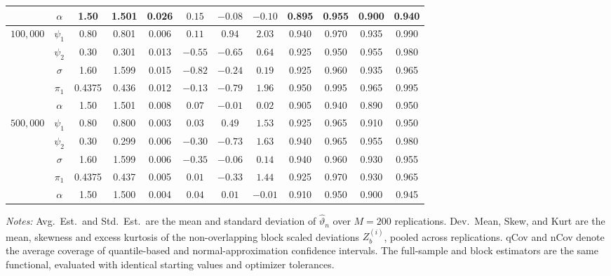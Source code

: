 \begin{table}[!h]
{\begin{tabular}{lccccccccccc}
& $\alpha$ & 1.50 & 1.501 & 0.026 & $0.15$ & $-0.08$ & $-0.10$ & 0.895 & 0.955 & 0.900 & 0.940 \\
\midrule
\multirow{5}{*}{$100{,}000$}
& $\psi_1$ & 0.80 & 0.801 & 0.006 & $0.11$ & $0.94$ & $2.03$ & 0.940 & 0.970 & 0.935 & 0.990 \\
& $\psi_2$ & 0.30 & 0.301 & 0.013 & $-0.55$ & $-0.65$ & $0.64$ & 0.925 & 0.950 & 0.955 & 0.980 \\
& $\sigma$ & 1.60 & 1.599 & 0.015 & $-0.82$ & $-0.24$ & $0.19$ & 0.925 & 0.960 & 0.935 & 0.965 \\
& $\pi_1$ & 0.4375 & 0.436 & 0.012 & $-0.13$ & $-0.79$ & $1.96$ & 0.950 & 0.995 & 0.965 & 0.995 \\
& $\alpha$ & 1.50 & 1.501 & 0.008 & $0.07$ & $-0.01$ & $0.02$ & 0.905 & 0.940 & 0.890 & 0.950 \\
\midrule
\multirow{5}{*}{$500{,}000$}
& $\psi_1$ & 0.80 & 0.800 & 0.003 & $0.03$ & $0.49$ & $1.53$ & 0.925 & 0.965 & 0.910 & 0.950 \\
& $\psi_2$ & 0.30 & 0.299 & 0.006 & $-0.30$ & $-0.73$ & $1.63$ & 0.940 & 0.965 & 0.955 & 0.980 \\
& $\sigma$ & 1.60 & 1.599 & 0.006 & $-0.35$ & $-0.06$ & $0.14$ & 0.940 & 0.960 & 0.930 & 0.955 \\
& $\pi_1$ & 0.4375 & 0.437 & 0.005 & $0.01$ & $-0.33$ & $1.44$ & 0.925 & 0.970 & 0.930 & 0.965 \\
& $\alpha$ & 1.50 & 1.500 & 0.004 & $0.04$ & $0.01$ & $-0.01$ & 0.910 & 0.950 & 0.900 & 0.945 \\
\bottomrule
\end{tabular}%
}
\begin{flushleft}
\footnotesize\textit{Notes:} Avg.~Est.\ and Std.~Est.\ are the mean and standard deviation of $\hat{\vartheta}_n$ over $M=200$ replications.  Dev.~Mean, Skew, and Kurt are the mean, skewness and excess kurtosis of the non-overlapping block scaled deviations $Z^{(i)}_b$, pooled across replications.  qCov and nCov denote the average coverage of quantile-based and normal-approximation confidence intervals.  The full-sample and block estimators are the same functional, evaluated with identical starting values and optimizer tolerances.
\end{flushleft}
\end{table}


